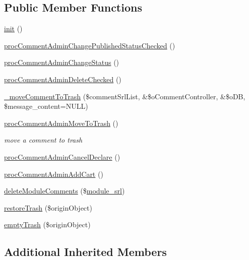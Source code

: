 \subsection*{Public Member Functions}
\begin{DoxyCompactItemize}
\item 
\hyperlink{classcommentAdminController_abf17eb18137aa56c78b455fdd2b71b1f}{init} ()
\item 
\hyperlink{classcommentAdminController_a7d6c3e0db01617f4789f42617a876da0}{proc\+Comment\+Admin\+Change\+Published\+Status\+Checked} ()
\item 
\hyperlink{classcommentAdminController_a70bde7bc9124b72df7bdf6bf09633148}{proc\+Comment\+Admin\+Change\+Status} ()
\item 
\hyperlink{classcommentAdminController_ad62c47962884acf8b3a862f075b31343}{proc\+Comment\+Admin\+Delete\+Checked} ()
\item 
\hyperlink{classcommentAdminController_a2ac42957d98a26a13576e174ec5fc4e6}{\+\_\+move\+Comment\+To\+Trash} (\$comment\+Srl\+List, \&\$o\+Comment\+Controller, \&\$o\+D\+B, \$message\+\_\+content=N\+U\+L\+L)
\item 
\hyperlink{classcommentAdminController_a714ff343633602dc806e0dc257a12a7f}{proc\+Comment\+Admin\+Move\+To\+Trash} ()
\begin{DoxyCompactList}\small\item\em move a comment to trash \end{DoxyCompactList}\item 
\hyperlink{classcommentAdminController_ae0673fe66c74aa6ebfd8c6f1e5d0c627}{proc\+Comment\+Admin\+Cancel\+Declare} ()
\item 
\hyperlink{classcommentAdminController_adea631f91fd944326a1363dbff258d2f}{proc\+Comment\+Admin\+Add\+Cart} ()
\item 
\hyperlink{classcommentAdminController_a72c265be53cc3b664cd0702a568bc05f}{delete\+Module\+Comments} (\$\hyperlink{ko_8install_8php_a370bb6450fab1da3e0ed9f484a38b761}{module\+\_\+srl})
\item 
\hyperlink{classcommentAdminController_aede089003a6f45e3982a6a7e97b63cdf}{restore\+Trash} (\$origin\+Object)
\item 
\hyperlink{classcommentAdminController_a2b58a744dab20359d036052d505dbb49}{empty\+Trash} (\$origin\+Object)
\end{DoxyCompactItemize}
\subsection*{Additional Inherited Members}


